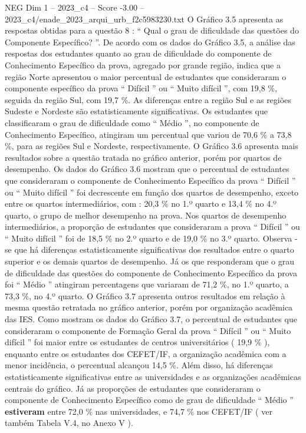 \begin{textsample}{NEG Dim 1 – 2023\_c4 – Score -3.00 – 2023\_c4/enade\_2023\_arqui\_urb\_f2c5983230.txt}
O Gráfico 3.5 apresenta as respostas obtidas para a questão 8 : “ Qual o grau de dificuldade das questões do Componente Específico? ”.
De acordo com os dados do Gráfico 3.5, a análise das respostas dos estudantes quanto ao grau de dificuldade do componente de Conhecimento Específico da prova, agregado por grande região, indica que a região Norte apresentou o maior percentual de estudantes que consideraram o componente específico da prova “ Difícil ” ou “ Muito difícil ”, com 19,8 \%, seguida da região Sul, com 19,7 \%.
As diferenças entre a região Sul e as regiões Sudeste e Nordeste são estatisticamente significativas.
Os estudantes que classificaram o grau de dificuldade como “ Médio ”, no componente de Conhecimento Específico, atingiram um percentual que variou de 70,6 \% a 73,8 \%, para as regiões Sul e Nordeste, respectivamente.
O Gráfico 3.6 apresenta mais resultados sobre a questão tratada no gráfico anterior, porém por quartos de desempenho.
Os dados do Gráfico 3.6 mostram que o percentual de estudantes que consideraram o componente de Conhecimento Específico da prova “ Difícil ” ou “ Muito difícil ” foi decrescente em função dos quartos de desempenho, exceto entre os quartos intermediários, com : 20,3 \% no 1.º quarto e 13,4 \% no 4.º quarto, o grupo de melhor desempenho na prova.
Nos quartos de desempenho intermediários, a proporção de estudantes que consideraram a prova “ Difícil ” ou “ Muito difícil ” foi de 18,5 \% no 2.º quarto e de 19,0 \% no 3.º quarto.
Observa -se que há diferenças estatisticamente significativas dos resultados entre o quarto superior e os demais quartos de desempenho.
Já os que responderam que o grau de dificuldade das questões do componente de Conhecimento Específico da prova foi “ Médio ” atingiram percentagens que variaram de 71,2 \%, no 1.º quarto, a 73,3 \%, no 4.º quarto.
O Gráfico 3.7 apresenta outros resultados em relação à mesma questão retratada no gráfico anterior, porém por organização acadêmica das IES.
Como mostram os dados do Gráfico 3.7, o percentual de estudantes que consideraram o componente de Formação Geral da prova “ Difícil ” ou “ Muito difícil ” foi maior entre os estudantes de centros universitários ( 19,9 \% ), enquanto entre os estudantes dos CEFET/IF, a organização acadêmica com a menor incidência, o percentual alcançou 14,5 \%.
Além disso, há diferenças estatisticamente significativas entre as universidades e as organizações acadêmicas centrais do gráfico.
Já as proporções de estudantes que consideraram o componente de Conhecimento Específico como de grau de dificuldade “ Médio ” \textbf{estiveram} entre 72,0 \% nas universidades, e 74,7 \% nos CEFET/IF ( ver também Tabela V.4, no Anexo V ).

\end{textsample}
